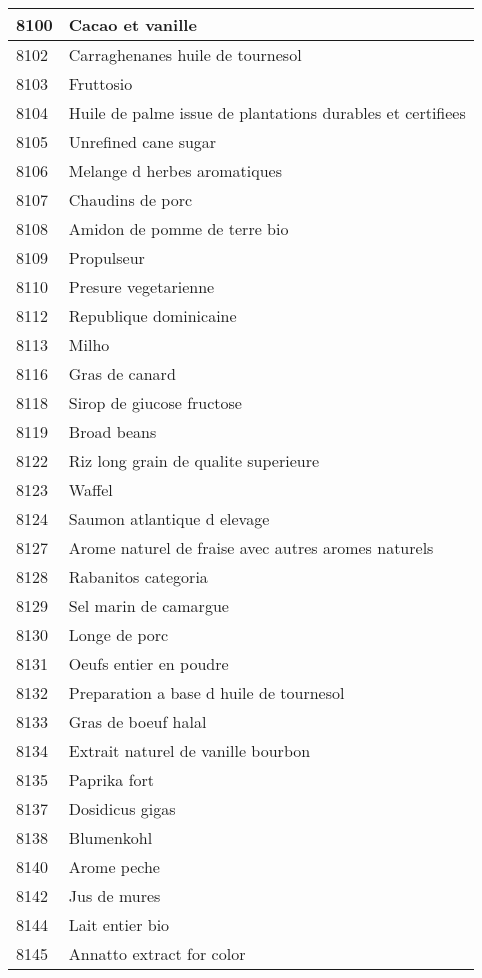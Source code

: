 \begin{longtable}{|l|l|}
8100 & Cacao et vanille \\ \hline 
8102 & Carraghenanes huile de tournesol \\ \hline 
8103 & Fruttosio \\ \hline 
8104 & Huile de palme issue de plantations durables et certifiees \\ \hline 
8105 & Unrefined cane sugar \\ \hline 
8106 & Melange d herbes aromatiques \\ \hline 
8107 & Chaudins de porc \\ \hline 
8108 & Amidon de pomme de terre bio \\ \hline 
8109 & Propulseur \\ \hline 
8110 & Presure vegetarienne \\ \hline 
8112 & Republique dominicaine \\ \hline 
8113 & Milho \\ \hline 
8116 & Gras de canard \\ \hline 
8118 & Sirop de giucose fructose \\ \hline 
8119 & Broad beans \\ \hline 
8122 & Riz long grain de qualite superieure \\ \hline 
8123 & Waffel \\ \hline 
8124 & Saumon atlantique d elevage \\ \hline 
8127 & Arome naturel de fraise avec autres aromes naturels \\ \hline 
8128 & Rabanitos categoria \\ \hline 
8129 & Sel marin de camargue \\ \hline 
8130 & Longe de porc \\ \hline 
8131 & Oeufs entier en poudre \\ \hline 
8132 & Preparation a base d huile de tournesol \\ \hline 
8133 & Gras de boeuf halal \\ \hline 
8134 & Extrait naturel de vanille bourbon \\ \hline 
8135 & Paprika fort \\ \hline 
8137 & Dosidicus gigas \\ \hline 
8138 & Blumenkohl \\ \hline 
8140 & Arome peche \\ \hline 
8142 & Jus de mures \\ \hline 
8144 & Lait entier bio \\ \hline 
8145 & Annatto extract for color \\ \hline 

\end{longtable}
